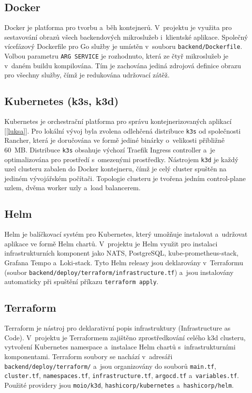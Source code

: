\documentclass[11pt, a4paper, oneside]{article}
\begin{document}
\subsection{Docker}

Docker je platforma pro tvorbu a~běh kontejnerů. V~projektu je využita pro sestavování obrazů všech backendových mikroslužeb i~klientské aplikace. Společný vícefázový Dockerfile pro Go služby je umístěn v~souboru \texttt{backend/Dockerfile}. Volbou parametru \texttt{ARG SERVICE} je rozhodnuto, která ze čtyř mikroslužeb je v~daném buildu kompilována. Tím je zachována jediná zdrojová definice obrazu pro všechny služby, čímž je redukována udržovací zátěž.

\subsection{Kubernetes (k3s, k3d)}

Kubernetes je orchestrační platforma pro správu kontejnerizovaných aplikací [\ref{luksa}]. Pro lokální vývoj byla zvolena odlehčená distribuce \texttt{k3s} od společnosti Rancher, která je doručována ve formě jediné binárky o~velikosti přibližně 60~MB. Distribuce \texttt{k3s} obsahuje výchozí Traefik Ingress controller a~je optimalizována pro prostředí s~omezenými prostředky. Nástrojem \texttt{k3d} je každý uzel clusteru zabalen do Docker kontejneru, čímž je celý cluster spuštěn na jediném vývojářském počítači. Topologie clusteru je tvořena jedním control-plane uzlem, dvěma worker uzly a~load balancerem.

\subsection{Helm}

Helm je balíčkovací systém pro Kubernetes, který umožňuje instalovat a~udržovat aplikace ve formě Helm chartů. V~projektu je Helm využit pro instalaci infrastrukturních komponent jako NATS, PostgreSQL, kube-prometheus-stack, Grafana Tempo a~Loki-stack. Tyto Helm releasy jsou deklarovány v~Terraformu (soubor \texttt{backend/deploy/terraform/infrastructure.tf}) a~jsou instalovány automaticky při spuštění příkazu \texttt{terraform apply}.

\subsection{Terraform}

Terraform je nástroj pro deklarativní popis infrastruktury (Infrastructure as Code). V~projektu je Terraformem zajištěno zprostředkování celého k3d clusteru, vytvoření Kubernetes namespace a~instalace Helm chartů s~infrastrukturními komponentami. Terraform soubory se nachází v~adresáři \texttt{backend/deploy/terraform/} a~jsou organizovány do souborů \texttt{main.tf}, \texttt{cluster.tf}, \texttt{namespaces.tf}, \texttt{infrastructure.tf}, \texttt{argocd.tf} a~\texttt{variables.tf}. Použité providery jsou \texttt{moio/k3d}, \texttt{hashicorp/kubernetes} a~\texttt{hashicorp/helm}.
\end{document}
